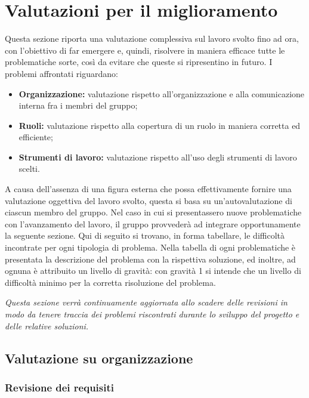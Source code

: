 \chapter{Valutazioni per il miglioramento} \label{ValutazionePerIlMiglioramento}
Questa sezione riporta una valutazione complessiva sul lavoro svolto fino ad ora, con l’obiettivo di far emergere e, quindi, risolvere in maniera efficace tutte le problematiche sorte, così da evitare che queste si ripresentino in futuro. 
I problemi affrontati riguardano: 
\begin{itemize}
\item \textbf{Organizzazione:} valutazione rispetto all'organizzazione e alla comunicazione interna fra i membri del gruppo;
\item \textbf{Ruoli:} valutazione rispetto alla copertura di un ruolo in maniera corretta ed efficiente;
\item \textbf{Strumenti di lavoro:} valutazione rispetto all’uso degli strumenti di lavoro scelti.
\end{itemize}
A causa dell’assenza di una figura esterna che possa effettivamente fornire una valutazione oggettiva del lavoro svolto, questa si basa su un'autovalutazione di ciascun membro del gruppo. 
Nel caso in cui si presentassero nuove problematiche con l’avanzamento del lavoro, il gruppo provvederà ad integrare opportunamente la seguente sezione.
Qui di seguito si trovano, in forma tabellare, le difficoltà incontrate per ogni tipologia di problema. Nella tabella di ogni problematiche è presentata la descrizione del problema con la rispettiva soluzione, ed inoltre, ad ognuna è attribuito un livello di gravità: con gravità 1 si intende che un livello di difficoltà minimo per la corretta risoluzione del problema.

\textit{Questa sezione verrà continuamente aggiornata allo scadere delle revisioni in modo da tenere traccia dei problemi riscontrati durante lo sviluppo del progetto e delle relative soluzioni.}
\clearpage

\section{Valutazione su organizzazione}  \label{ValutazionePerIlMiglioramentoValutazioneSuOrganizzazione}

\subsection{Revisione dei requisiti}\label{ValutazionePerIlMiglioramentoValutazioneSuOrganizzazioneRevisioneDeiRequisiti}

